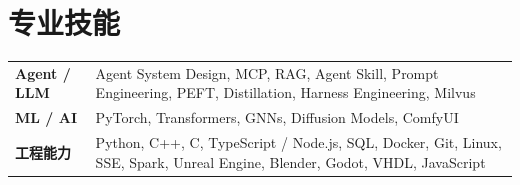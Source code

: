 \documentclass[a4paper,9pt]{extarticle}
\begin{document}
\section{专业技能}
\begin{tabularx}{\linewidth}{@{}l X@{}}
\textbf{Agent / LLM} & Agent System Design, MCP, RAG, Agent Skill, Prompt Engineering, PEFT, Distillation, Harness Engineering, Milvus\\
\textbf{ML / AI} & PyTorch, Transformers, GNNs, Diffusion Models, ComfyUI\\
\textbf{工程能力} & Python, C++, C, TypeScript / Node.js, SQL, Docker, Git, Linux, SSE, Spark, Unreal Engine, Blender, Godot, VHDL, JavaScript\\
\end{tabularx}
\end{document}
